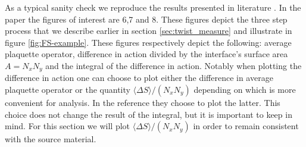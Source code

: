 \documentclass[english,twoside,openright]{UH_TCM_MSc}
\begin{document}
As a typical sanity check we reproduce the results presented in literature \cite{twist}. In the paper the figures of interest are 6,7 and 8. These figures depict the three step process that we describe earlier in section \ref{sec:twist_measure} and illustrate in figure \ref{fig:FS-example}. These figures respectively depict the following: average plaquette operator, difference in action divided by the interface's surface area $A=N_x N_y$ and the integral of the difference in action. Notably when plotting the difference in action one can choose to plot either the difference in average plaquette operator or the quantity $\langle \Delta S\rangle / (N_x N_y)$ depending on which is more convenient for analysis. In the reference they choose to plot the latter. This choice does not change the result of the integral, but it is important to keep in mind. For this section we will plot $\langle \Delta S\rangle / (N_x N_y)$ in order to remain consistent with the source material.
\end{document}
